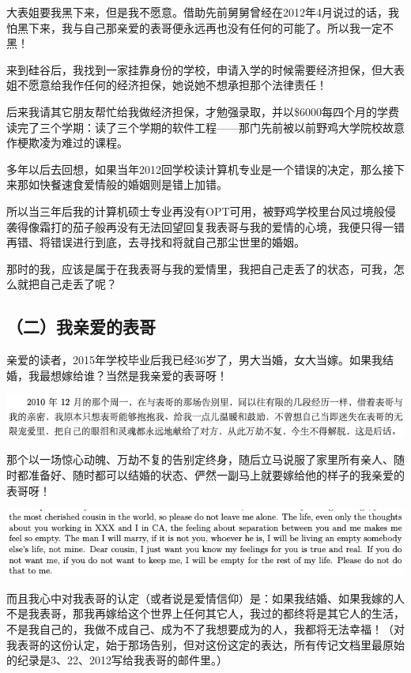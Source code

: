 \documentclass[9pt, b5paper]{article}
\begin{document}
大表姐要我黑下来，但是我不愿意。借助先前舅舅曾经在2012年4月说过的话，我怕黑下来，我与自己那亲爱的表哥便永远再也没有任何的可能了。所以我一定不黑！

来到硅谷后，我找到一家挂靠身份的学校，申请入学的时候需要经济担保，但大表姐不愿意给我作任何的经济担保，她说她不想承担那个法律责任！

后来我请其它朋友帮忙给我做经济担保，才勉强录取，并以\$6000每四个月的学费读完了三个学期：读了三个学期的软件工程——那门先前被以前野鸡大学院校故意作梗欺凌为难过的课程。

多年以后去回想，如果当年2012回学校读计算机专业是一个错误的决定，那么接下来那如快餐速食爱情般的婚姻则是错上加错。

所以当三年后我的计算机硕士专业再没有OPT可用，被野鸡学校里台风过境般侵袭得像霜打的茄子般再没有无法回望回复我表哥与我的爱情的心境，我便只得一错再错、将错误进行到底，去寻找和将就自己那尘世里的婚姻。

那时的我，应该是属于在我表哥与我的爱情里，我把自己走丢了的状态，可我，怎么就把自己走丢了呢？

\subsection{（二）我亲爱的表哥}
\label{sec:org0dc8ba2}

亲爱的读者，2015年学校毕业后我已经36岁了，男大当婚，女大当嫁。如果我结婚，我最想嫁给谁？当然是我亲爱的表哥呀！

\begin{center}
\includegraphics[width=.9\linewidth]{./pic/backups_plans_20210426_112346.png}
\end{center}

那个以一场惊心动魄、万劫不复的告别定终身，随后立马说服了家里所有亲人、随时都准备好、随时都可以结婚的状态、俨然一副马上就要嫁给他的样子的我亲爱的表哥呀！

\begin{center}
\includegraphics[width=.9\linewidth]{./pic/backups_plans_20210423_201706.png}
\end{center}

而且我心中对我表哥的认定（或者说是爱情信仰）是：如果我结婚、如果我嫁的人不是我表哥，那我再嫁给这个世界上任何其它人，我过的都终将是其它人的生活，不是我自己的，我做不成自己、成为不了我想要成为的人，我都将无法幸福！（对我表哥的这份认定，始于那场告别，但对这份这定的表达，所有传记文档里最原始的纪录是3、22、2012写给我表哥的邮件里。）
\end{document}
